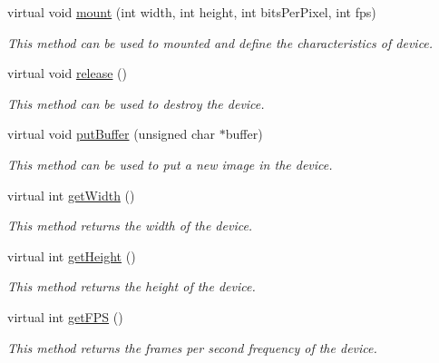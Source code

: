 \begin{DoxyCompactItemize}
\item 
virtual void \hyperlink{classbr_1_1ufscar_1_1lince_1_1streaming_1_1DeviceInterface_afb64a94cc5d0febe0cc167675a0c92bc}{mount} (int width, int height, int bitsPerPixel, int fps)
\begin{DoxyCompactList}\small\item\em This method can be used to mounted and define the characteristics of device. \item\end{DoxyCompactList}\item 
virtual void \hyperlink{classbr_1_1ufscar_1_1lince_1_1streaming_1_1DeviceInterface_a6c7a433458ca2b3cf93b2bc118fec114}{release} ()
\begin{DoxyCompactList}\small\item\em This method can be used to destroy the device. \item\end{DoxyCompactList}\item 
virtual void \hyperlink{classbr_1_1ufscar_1_1lince_1_1streaming_1_1DeviceInterface_a72af172828b8d1773fcf9e5d62d08353}{putBuffer} (unsigned char $\ast$buffer)
\begin{DoxyCompactList}\small\item\em This method can be used to put a new image in the device. \item\end{DoxyCompactList}\item 
virtual int \hyperlink{classbr_1_1ufscar_1_1lince_1_1streaming_1_1DeviceInterface_a37072d863c297b69afebfb4f53516a95}{getWidth} ()
\begin{DoxyCompactList}\small\item\em This method returns the width of the device. \item\end{DoxyCompactList}\item 
virtual int \hyperlink{classbr_1_1ufscar_1_1lince_1_1streaming_1_1DeviceInterface_a70b3166ea9f6a5e5e531aa9456ce7b6c}{getHeight} ()
\begin{DoxyCompactList}\small\item\em This method returns the height of the device. \item\end{DoxyCompactList}\item 
virtual int \hyperlink{classbr_1_1ufscar_1_1lince_1_1streaming_1_1DeviceInterface_a4b067b1b359ab0b63caf177f2512dfcb}{getFPS} ()
\begin{DoxyCompactList}\small\item\em This method returns the frames per second frequency of the device. \item\end{DoxyCompactList}\item 

\end{DoxyCompactItemize}
